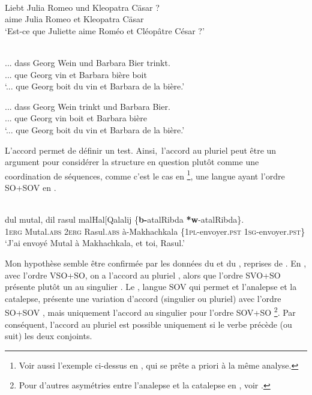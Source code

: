 \ea \label{ch2:ex15}
\\
\gll Liebt Julia Romeo und Kleopatra Cäsar ?\\
aime Julia Romeo et Kleopatra Cäsar\\
\glt ‘Est-ce que Juliette aime Roméo et Cléopâtre César ?’   
\z 

\ea \label{ch2:ex16}
\\
\ea 
\gll ... dass Georg Wein und Barbara Bier trinkt. \label{ch2:ex16a}\\
... que Georg vin et Barbara bière boit\\
\glt ‘... que Georg boit du vin et Barbara de la bière.’            

\ex 
\gll ... dass Georg Wein trinkt und Barbara Bier. \label{ch2:ex16b}\\
... que Georg vin boit et Barbara bière\\
\glt ‘... que Georg boit du vin et Barbara de la bière.’                  
\z
\z

L’accord permet de définir un test. Ainsi,~l’accord au pluriel peut être un argument pour considérer la structure en question plutôt comme une coordination de séquences, comme c’est le cas en \footnote{
 Voir aussi l’exemple  ci-dessus en , qui se prête a priori à la même analyse.}, une langue ayant l’ordre SO+SOV en .

\ea \label{ch2:ex17}
\\
\gll dul mutal, dil rasul malHal[Qalalij \{\textbf{b-}atalRibda {\textbar} \textbf{*w}-atalRibda\}. \\
\textsc{1erg} Mutal.\textsc{abs} \textsc{2erg} Rasul.\textsc{abs} à-Makhachkala 
\{\textsc{1pl}-envoyer.\textsc{pst} {\textbar} \textsc{1sg}-envoyer.\textsc{pst}\}\\
\glt ‘J’ai envoyé Mutal à Makhachkala, et toi, Rasul.’            
\z

\newpage 
Mon hypothèse semble être confirmée par les données du  et du , reprises de \citet{Kazenin2001}. En , avec l’ordre VSO+SO, on a l’accord au pluriel , alors que l’ordre SVO+SO présente plutôt un  au singulier . Le , langue SOV qui permet et l’analepse et la catalepse, présente une variation d’accord (singulier ou pluriel) avec l’ordre SO+SOV , mais uniquement l’accord au singulier pour l’ordre SOV+SO \footnote{
 Pour d’autres asymétries entre l’analepse et la catalepse en , voir \citet{Kazenin2001}.}. Par conséquent, l’accord au pluriel est possible uniquement si le verbe précède (ou suit) les deux conjoints.

